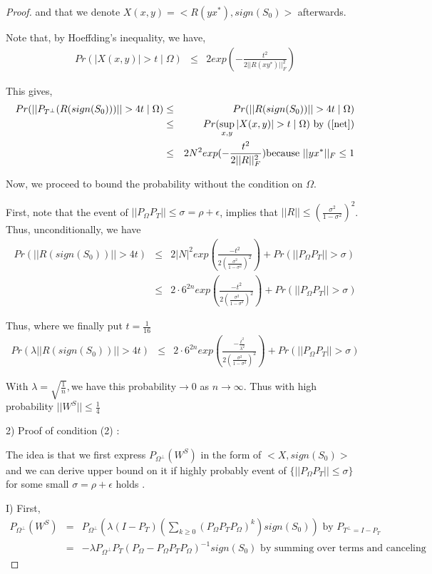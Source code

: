 \begin{proof}
and that we denote $X(x,y)=<R(yx^{*}),sign(S_{0})>$ afterwards.

Note that, by Hoeffding's inequality, we have,
\begin{eqnarray*}
Pr(|X(x,y)|>t\mid\Omega) & \le & 2exp(-\frac{t^{2}}{2||R(xy^{*})||_{F}^{2}})
\end{eqnarray*}


This gives,
\begin{eqnarray*}
Pr(||P_{T^{\bot}}(R(sign(S_{0})))||>4t\mid\Omega) & \le & Pr(||R(sign(S_{0}))||>4t\mid\Omega)\\
 & \le & Pr(\sup_{x,y}|X(x,y)|>t\mid\Omega) \text{ by (\ref{net})}\\
 & \le & 2N^{2}exp(-\frac{t^{2}}{2||R||_{F}^{2}})\text{because }||yx^{*}||_{F}\le1
\end{eqnarray*}


Now, we proceed to bound the probability without the condition on $\Omega$.

First, note that the event of $||P_{\Omega}P_{T}||\le\sigma=\rho+\epsilon$, implies that $||R||\le(\frac{\sigma^{2}}{1-\sigma^{2}})^{2}$. Thus, unconditionally, we have
\begin{eqnarray*}
Pr(||R(sign(S_{0}))||>4t) & \le & 2|N|^{2}exp(\frac{-t^{2}}{2(\frac{\sigma^{2}}{1-\sigma^{2}})^{2}})+Pr(||P_{\Omega}P_{T}||>\sigma)\\
 & \le & 2\cdot6^{2n}exp(\frac{-t^{2}}{2(\frac{\sigma^{2}}{1-\sigma^{2}})^{2}})+Pr(||P_{\Omega}P_{T}||>\sigma)
\end{eqnarray*}


Thus, where we finally put $t=\frac{1}{16}$
\begin{eqnarray*}
Pr(\lambda||R(sign(S_{0}))||>4t) & \le & 2\cdot6^{2n}exp(\frac{-\frac{t^{2}}{\lambda^{2}}}{2(\frac{\sigma^{2}}{1-\sigma^{2}})^{2}})+Pr(||P_{\Omega}P_{T}||>\sigma)
\end{eqnarray*}


With $\lambda=\sqrt{\frac{1}{n}},$we have this probability$\to0$ as $n\to\infty$. Thus with high probability $||W^{S}||\le\frac{1}{4}$

2) Proof of condition (2) :

The idea is that we first express $P_{\Omega^{\bot}}(W^{S})$ in the form of $<X,sign(S_{0})>$and we can derive upper bound on it if highly probably event of $\{||P_{\Omega}P_{T}||\le\sigma\}$ for some small $\sigma=\rho+\epsilon$ holds .

I) First,
\begin{eqnarray}
P_{\Omega^{\bot}}(W^{S}) & = & P_{\Omega^{\bot}}(\lambda(I-P_{T})(\sum_{k\ge0}(P_{\Omega}P_{T}P_{\Omega})^{k})sign(S_{0})) \text{ by } P_{T^{\bot} = I- P_T}\\
 & = & -\lambda P_{\Omega^{\bot}}P_{T}(P_{\Omega}-P_{\Omega}P_{T}P_{\Omega})^{-1}sign(S_{0}) \text{ by  summing over terms and canceling} \label{wsp1}
\end{eqnarray}



\end{proof}
